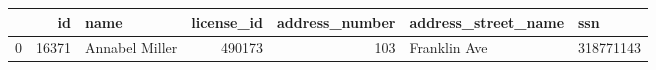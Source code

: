 \begin{tabular}{lrlrrll}
\toprule
 & id & name & license_id & address_number & address_street_name & ssn \\
\midrule
0 & 16371 & Annabel Miller & 490173 & 103 & Franklin Ave & 318771143 \\
\bottomrule
\end{tabular}
